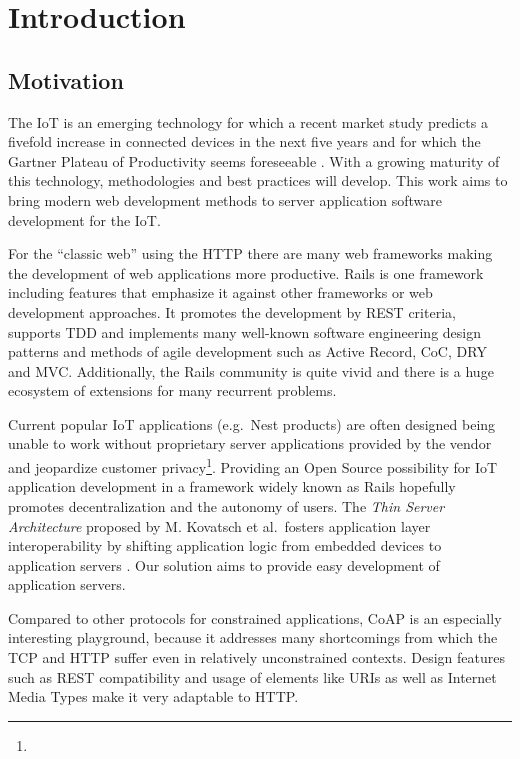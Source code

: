 \chapter{Introduction}
\label{cha:introduction}

\section{Motivation}

	The \acf{IoT} is an emerging technology for which a recent market study
	predicts a fivefold increase in connected devices in the next five years
	\cite{verizon} and for which the Gartner Plateau of Productivity seems
	foreseeable \cite{hype-cycle}. With a growing maturity of this technology,
	methodologies and best practices will develop. This work aims to bring
	modern web development methods to server application software development
	for the \ac{IoT}.

	For the \enquote{classic web} using the \acf{HTTP} there are many web
	frameworks making the development of web applications more productive.
	\ac{Rails} is one framework including features that emphasize it against
	other frameworks or web development approaches. It promotes the development
	by \acs{REST} criteria, supports \acf{TDD} and implements many well-known
	software engineering design patterns and methods of agile development such
	as Active Record, \ac{CoC}, \ac{DRY} and \ac{MVC}. Additionally, the
	\ac{Rails} community is quite vivid and there is a huge ecosystem of
	extensions for many recurrent problems.

	Current popular \ac{IoT} applications (e.g.\ Nest products) are often
	designed being unable to work without proprietary server applications
	provided by the vendor and jeopardize customer
	privacy\footnote{\urlNestPrivacy}. Providing an Open Source possibility for
	\ac{IoT} application development in a framework widely known as \ac{Rails}
	hopefully promotes decentralization and the autonomy of users. The
	\emph{Thin Server Architecture} proposed by M. Kovatsch et al.\ fosters
	application layer interoperability by shifting application logic from
	embedded devices to application servers \cite{thin-server}. Our solution
	aims to provide easy development of application servers.

	Compared to other protocols for constrained applications, \ac{CoAP} is an
	especially interesting playground, because it addresses many shortcomings
	from which the \ac{TCP} and \ac{HTTP} suffer even in relatively
	unconstrained contexts. Design features such as \ac{REST} compatibility and
	usage of elements like \acp{URI} as well as Internet Media Types make it
	very adaptable to \ac{HTTP}.

